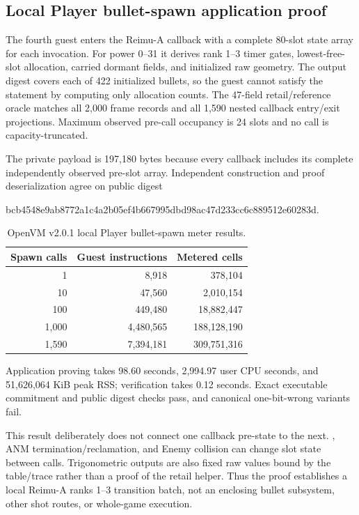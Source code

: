 \subsection{Local Player bullet-spawn application proof}

The fourth guest enters the Reimu-A callback with a complete 80-slot state
array for each invocation.  For power 0--31 it derives rank 1--3 timer gates,
lowest-free-slot allocation, carried dormant fields, and initialized raw
geometry.  The output digest covers each of 422 initialized bullets, so the
guest cannot satisfy the statement by computing only allocation counts.  The
47-field retail/reference oracle matches all 2,000 frame records and all 1,590
nested callback entry/exit projections.  Maximum observed pre-call occupancy
is 24 slots and no call is capacity-truncated.

The private  payload is 197,180 bytes because every callback
includes its complete independently observed pre-slot array.  Independent
construction and proof deserialization agree on public digest
\begin{center}
\small\ttfamily
bcb4548e9ab8772a1c4a2b05ef4b667995dbd98ac47d233cc6c889512e60283d.
\end{center}

\begin{table}[h]
  \centering
  \small
  \begin{tabular}{@{}rrr@{}}
    \toprule
    Spawn calls & Guest instructions & Metered cells \\
    \midrule
    1     & 8,918     & 378,104 \\
    10    & 47,560    & 2,010,154 \\
    100   & 449,480   & 18,882,447 \\
    1,000 & 4,480,565 & 188,128,190 \\
    1,590 & 7,394,181 & 309,751,316 \\
    \bottomrule
  \end{tabular}
  \caption{OpenVM v2.0.1 local Player bullet-spawn meter results.}
  \label{tab:openvm-player-bullets-meter}
\end{table}

Application proving takes 98.60 seconds, 2,994.97 user CPU seconds, and
51,626,064 KiB peak RSS; verification takes 0.12 seconds.  Exact executable
commitment and public digest checks pass, and canonical one-bit-wrong variants
fail.

This result deliberately does not connect one callback pre-state to the next.
, ANM termination/reclamation, and Enemy collision
can change slot state between calls.  Trigonometric outputs are also fixed raw
values bound by the table/trace rather than a proof of the retail helper.
Thus the proof establishes a local Reimu-A ranks 1--3 transition batch, not an
enclosing bullet subsystem, other shot routes, or whole-game execution.

